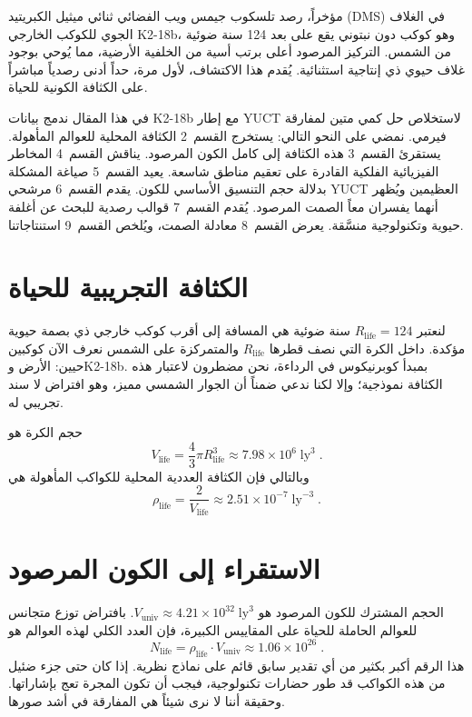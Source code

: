 \documentclass[11pt,a4paper]{article}
\begin{document}
	مؤخراً، رصد تلسكوب جيمس ويب الفضائي ثنائي ميثيل الكبريتيد (DMS) في الغلاف الجوي للكوكب الخارجي K2-18b، وهو كوكب دون نبتوني يقع على بعد 124 سنة ضوئية من الشمس. التركيز المرصود أعلى برتب أسية من الخلفية الأرضية، مما يُوحي بوجود غلاف حيوي ذي إنتاجية استثنائية. يُقدم هذا الاكتشاف، لأول مرة، حداً أدنى رصدياً مباشراً على الكثافة الكونية للحياة.
	
	في هذا المقال ندمج بيانات K2-18b مع إطار YUCT لاستخلاص حل كمي متين لمفارقة فيرمي. نمضي على النحو التالي: يستخرج القسم~2 الكثافة المحلية للعوالم المأهولة. يستقرئ القسم~3 هذه الكثافة إلى كامل الكون المرصود. يناقش القسم~4 المخاطر الفيزيائية الفلكية القادرة على تعقيم مناطق شاسعة. يعيد القسم~5 صياغة المشكلة بدلالة حجم التنسيق الأساسي للكون. يقدم القسم~6 مرشحي YUCT العظيمين ويُظهر أنهما يفسران معاً الصمت المرصود. يُقدم القسم~7 قوالب رصدية للبحث عن أغلفة حيوية وتكنولوجية منسَّقة. يعرض القسم~8 معادلة الصمت، ويُلخص القسم~9 استنتاجاتنا.
	
	\section{الكثافة التجريبية للحياة}
	\label{sec:empirical}
	لنعتبر \(R_{\mathrm{life}} = 124\) سنة ضوئية هي المسافة إلى أقرب كوكب خارجي ذي بصمة حيوية مؤكدة. داخل الكرة التي نصف قطرها \(R_{\mathrm{life}}\) والمتمركزة على الشمس نعرف الآن كوكبين حيين: الأرض وK2-18b. بمبدأ كوبرنيكوس في الرداءة، نحن مضطرون لاعتبار هذه الكثافة نموذجية؛ وإلا لكنا ندعي ضمناً أن الجوار الشمسي مميز، وهو افتراض لا سند تجريبي له.
	
	حجم الكرة هو
	\begin{equation}
		V_{\mathrm{life}} = \frac{4}{3}\pi R_{\mathrm{life}}^{3}
		\approx 7.98\times 10^{6}\;\mathrm{ly}^{3}\;.
	\end{equation}
	وبالتالي فإن الكثافة العددية المحلية للكواكب المأهولة هي
	\begin{equation}
		\rho_{\mathrm{life}} = \frac{2}{V_{\mathrm{life}}}
		\approx 2.51\times 10^{-7}\;\mathrm{ly}^{-3}\;.
	\end{equation}
	
	\section{الاستقراء إلى الكون المرصود}
	\label{sec:extrapolation}
	الحجم المشترك للكون المرصود هو
	\(V_{\mathrm{univ}} \approx 4.21\times 10^{32}\;\mathrm{ly}^{3}\).
	بافتراض توزع متجانس للعوالم الحاملة للحياة على المقاييس الكبيرة، فإن العدد الكلي لهذه العوالم هو
	\begin{equation}
		\label{eq:N_life_total}
		N_{\mathrm{life}} = \rho_{\mathrm{life}} \cdot V_{\mathrm{univ}}
		\approx 1.06\times 10^{26}\; .
	\end{equation}
	هذا الرقم أكبر بكثير من أي تقدير سابق قائم على نماذج نظرية. إذا كان حتى جزء ضئيل من هذه الكواكب قد طور حضارات تكنولوجية، فيجب أن تكون المجرة تعج بإشاراتها. وحقيقة أننا لا نرى شيئاً هي المفارقة في أشد صورها.
	
\end{document}
